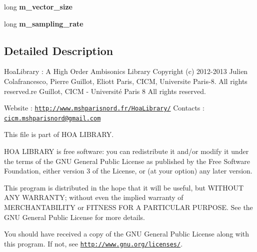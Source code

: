 \begin{DoxyCompactItemize}
\item 
\hypertarget{class_planewaves_a0980687d11060fab5714954390e71588}{long {\bfseries m\-\_\-vector\-\_\-size}}\label{class_planewaves_a0980687d11060fab5714954390e71588}

\item 
\hypertarget{class_planewaves_a54f363a918f24543a4584263ff6b4eba}{long {\bfseries m\-\_\-sampling\-\_\-rate}}\label{class_planewaves_a54f363a918f24543a4584263ff6b4eba}

\end{DoxyCompactItemize}


\subsection{Detailed Description}
Hoa\-Library \-: A High Order Ambisonics Library Copyright (c) 2012-\/2013 Julien Colafrancesco, Pierre Guillot, Eliott Paris, C\-I\-C\-M, Universite Paris-\/8. All rights reserved.\-re Guillot, C\-I\-C\-M -\/ Université Paris 8 All rights reserved.

Website \-: \href{http://www.mshparisnord.fr/HoaLibrary/}{\tt http\-://www.\-mshparisnord.\-fr/\-Hoa\-Library/} Contacts \-: \href{mailto:cicm.mshparisnord@gmail.com}{\tt cicm.\-mshparisnord@gmail.\-com}

This file is part of H\-O\-A L\-I\-B\-R\-A\-R\-Y.

H\-O\-A L\-I\-B\-R\-A\-R\-Y is free software\-: you can redistribute it and/or modify it under the terms of the G\-N\-U General Public License as published by the Free Software Foundation, either version 3 of the License, or (at your option) any later version.

This program is distributed in the hope that it will be useful, but W\-I\-T\-H\-O\-U\-T A\-N\-Y W\-A\-R\-R\-A\-N\-T\-Y; without even the implied warranty of M\-E\-R\-C\-H\-A\-N\-T\-A\-B\-I\-L\-I\-T\-Y or F\-I\-T\-N\-E\-S\-S F\-O\-R A P\-A\-R\-T\-I\-C\-U\-L\-A\-R P\-U\-R\-P\-O\-S\-E. See the G\-N\-U General Public License for more details.

You should have received a copy of the G\-N\-U General Public License along with this program. If not, see \href{http://www.gnu.org/licenses/}{\tt http\-://www.\-gnu.\-org/licenses/}. 

